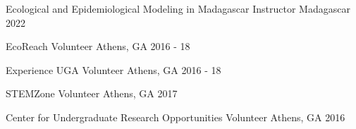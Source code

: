 


\begin{cvhonors}


    \cvhonor
      {Ecological and Epidemiological Modeling in Madagascar}
      {Instructor}
      {Madagascar}
      {2022}

    \cvhonor
      {EcoReach}
      {Volunteer}
      {Athens, GA}
      {2016 - 18}

    \cvhonor
      {Experience UGA}
      {Volunteer}
      {Athens, GA}
      {2016 - 18}

    \cvhonor
      {STEMZone}
      {Volunteer}
      {Athens, GA}
      {2017}

    \cvhonor
      {Center for Undergraduate Research Opportunities} %
      {Volunteer} %
      {Athens, GA} %
      {2016} %
\end{cvhonors}

